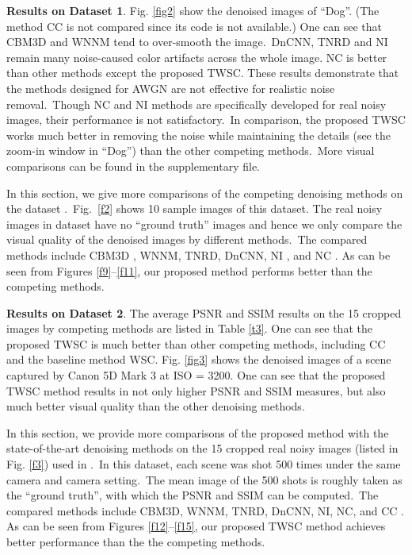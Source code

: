 \textbf{Results on Dataset 1}. Fig. \ref{fig2} show the denoised images of ``Dog''. (The method CC \cite{crosschannel2016} is not compared since its code is not available.) One can see that CBM3D and WNNM tend to over-smooth the image.\ DnCNN, TNRD and NI remain many noise-caused color artifacts across the whole image. NC is better than other methods except the proposed TWSC. These results demonstrate that the methods designed for AWGN are not effective for realistic noise removal.\ Though NC and NI methods are specifically developed for real noisy images, their performance is not satisfactory.\ In comparison, the proposed TWSC works much better in removing the noise while maintaining the details (see the zoom-in window in ``Dog'') than the other competing methods.\ More visual comparisons can be found in the supplementary file.

In this section, we give more comparisons of the competing denoising methods on the dataset \cite{ncwebsite}.\ Fig.\ \ref{f2} shows 10 sample images of this dataset. The real noisy images in dataset \cite{ncwebsite} have no ``ground truth'' images and hence we only compare the visual quality of the denoised images by different methods.\ The compared methods include CBM3D \cite{cbm3d}, WNNM, TNRD, DnCNN, NI \cite{neatimage}, and NC \cite{noiseclinic}. As can be seen from Figures \ref{f9}--\ref{f11}, our proposed method performs better than the competing methods.

\textbf{Results on Dataset 2}. The average PSNR and SSIM results on the 15 cropped images by competing methods are listed in Table \ref{t3}. One can see that the proposed TWSC is much better than other competing methods, including CC and the baseline method WSC. Fig. \ref{fig3} shows the denoised images of a scene captured by Canon 5D Mark 3 at ISO = 3200. One can see that the proposed TWSC method results in not only higher PSNR and SSIM measures, but also much better visual quality than the other denoising methods.

In this section, we provide more comparisons of the proposed method with the state-of-the-art denoising methods on the 15 cropped real noisy images (listed in Fig. \ref{f3}) used in \cite{crosschannel2016}.\ In this dataset, each scene was shot 500 times under the same camera and camera setting.\ The mean image of the 500 shots is roughly taken as the ``ground truth'', with which the PSNR and SSIM \cite{ssim} can be computed.\  The compared methods include CBM3D, WNNM, TNRD, DnCNN, NI, NC, and CC \cite{crosschannel2016}. As can be seen from Figures \ref{f12}--\ref{f15}, our proposed TWSC method achieves better performance than the the competing methods.


